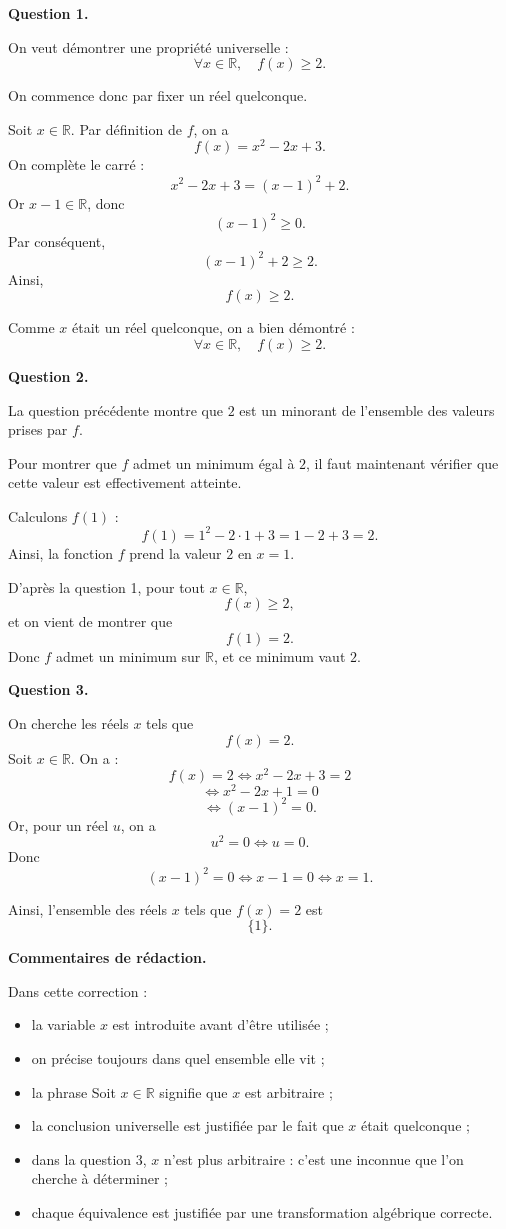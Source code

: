 \documentclass[11pt,a4paper]{article}
\begin{document}
\begin{preuvebox}[title={Correction détaillée et rédaction modèle}]

\textbf{Question 1.}

On veut démontrer une propriété universelle :
\[
\forall x\in\mathbb{R},\quad f(x)\geq 2.
\]

On commence donc par fixer un réel quelconque.

Soit $x\in\mathbb{R}$. Par définition de $f$, on a
\[
f(x)=x^2-2x+3.
\]
On complète le carré :
\[
x^2-2x+3=(x-1)^2+2.
\]
Or $x-1\in\mathbb{R}$, donc
\[
(x-1)^2\geq 0.
\]
Par conséquent,
\[
(x-1)^2+2\geq 2.
\]
Ainsi,
\[
f(x)\geq 2.
\]

Comme $x$ était un réel quelconque, on a bien démontré :
\[
\forall x\in\mathbb{R},\quad f(x)\geq 2.
\]

\medskip

\textbf{Question 2.}

La question précédente montre que $2$ est un minorant de l'ensemble des valeurs prises par $f$.

Pour montrer que $f$ admet un minimum égal à $2$, il faut maintenant vérifier que cette valeur est effectivement atteinte.

Calculons $f(1)$ :
\[
f(1)=1^2-2\cdot 1+3=1-2+3=2.
\]
Ainsi, la fonction $f$ prend la valeur $2$ en $x=1$.

D'après la question 1, pour tout $x\in\mathbb{R}$,
\[
f(x)\geq 2,
\]
et on vient de montrer que
\[
f(1)=2.
\]
Donc $f$ admet un minimum sur $\mathbb{R}$, et ce minimum vaut $2$.

\medskip

\textbf{Question 3.}

On cherche les réels $x$ tels que
\[
f(x)=2.
\]
Soit $x\in\mathbb{R}$. On a :
\[
f(x)=2
\iff x^2-2x+3=2
\]
\[
\iff x^2-2x+1=0
\]
\[
\iff (x-1)^2=0.
\]
Or, pour un réel $u$, on a
\[
u^2=0 \iff u=0.
\]
Donc
\[
(x-1)^2=0 \iff x-1=0 \iff x=1.
\]

Ainsi, l'ensemble des réels $x$ tels que $f(x)=2$ est
\[
\{1\}.
\]

\medskip

\textbf{Commentaires de rédaction.}

Dans cette correction :
\begin{itemize}
    \item la variable $x$ est introduite avant d'être utilisée ;
    \item on précise toujours dans quel ensemble elle vit ;
    \item la phrase \og Soit $x\in\mathbb{R}$ \fg{} signifie que $x$ est arbitraire ;
    \item la conclusion universelle est justifiée par le fait que $x$ était quelconque ;
    \item dans la question 3, $x$ n'est plus arbitraire : c'est une inconnue que l'on cherche à déterminer ;
    \item chaque équivalence est justifiée par une transformation algébrique correcte.
\end{itemize}

\end{preuvebox}
\end{document}
